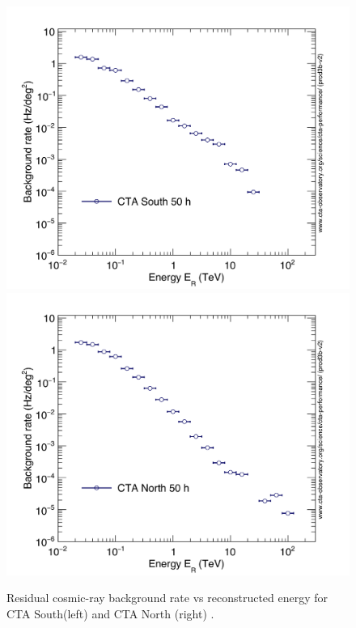 \documentclass[main.tex]{subfiles}
\begin{document}
\begin{itemize}
  \begin{figure}[!htb]
    \includegraphics[width=\linewidth]{Pictures/CTA-Performance-prod3b-v2-South-20deg-BackgroundRateSquDeg.pdf}
    \endminipage\hfill
    \includegraphics[width=\linewidth]{Pictures/CTA-Performance-prod3b-v2-North-20deg-BackgroundRateSquDeg.pdf}
    \endminipage\hfill
    \caption{\label{fig:bkgrate} Residual cosmic-ray background rate vs reconstructed energy for CTA South(left) and CTA North (right) \cite{CTAPerformance}.}
  \end{figure}
  

\end{itemize}
\end{document}
